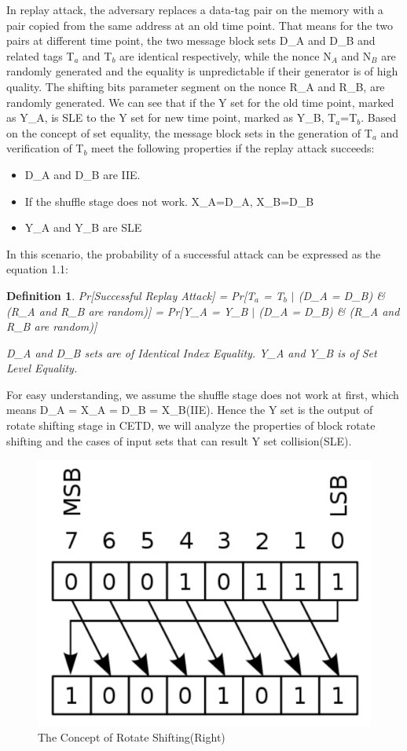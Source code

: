 \documentclass{article}
\newtheorem{defination}{Definition}[section]
\begin{document}
In replay attack, the adversary replaces a data-tag pair on the memory with a
pair copied from the same address at an old time point. That means for the two
pairs at different time point, the two message block sets D\_A and D\_B and related tags T$_a$ and T$_b$ are
identical respectively, while the nonce N$_A$ and N$_B$ are randomly generated and
the equality is unpredictable if their generator is of high quality. The shifting bits parameter segment on the nonce R\_A and R\_B, are randomly
generated.
We can see that if the Y set for the old time point, marked as Y\_A, is SLE to the Y set for new time point, marked as Y\_B, T$_a$=T$_b$.
Based on the concept of set equality, the message block sets in the generation of T$_a$ and verification of T$_b$ meet the following properties if the replay attack succeeds:
\begin{itemize}
	\item D\_A and D\_B are IIE.
	\item If the shuffle stage does not work. X\_A=D\_A, X\_B=D\_B
	\item Y\_A and Y\_B are SLE
\end{itemize}

In this scenario, the probability of a successful attack can be expressed as the equation 1.1:
\begin{defination}
Pr[Successful Replay Attack] = Pr[T$_a$ = T$_b$ $\mid$ (D\_A = D\_B) \& (R\_A and R\_B are random)]
							 = Pr[Y\_A = Y\_B $\mid$ (D\_A = D\_B) \& (R\_A and R\_B are random)]
							 
D\_A and D\_B sets are of Identical Index Equality. Y\_A and Y\_B is of Set Level Equality.
\end{defination} 
For easy understanding, we assume the shuffle stage does not work at first, which means D\_A = X\_A = D\_B = X\_B(IIE). Hence the Y set is the output of rotate shifting stage in CETD, we will analyze the properties of block rotate shifting and the cases of input sets that can result Y set collision(SLE). 

\begin{figure}[htbp]
 \centering
 \includegraphics[scale=0.4]{./diagrams/rotate_right.pdf}
 \caption{The Concept of Rotate Shifting(Right)}
 \label{fig:1 }
\end{figure}
\end{document}
